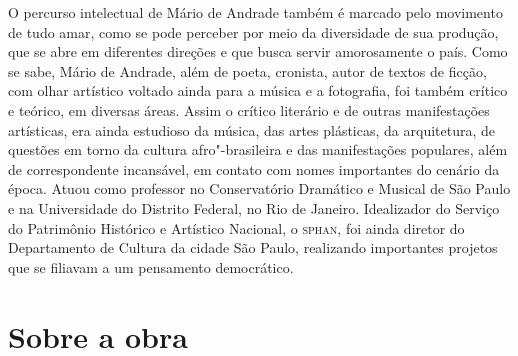 \medskip

O percurso intelectual de Mário de Andrade também é marcado pelo
movimento de tudo amar, como se pode perceber por meio da diversidade de
sua produção, que se abre em diferentes direções e que busca servir
amorosamente o país. Como se sabe, Mário de Andrade, além de poeta,
cronista, autor de textos de ficção, com olhar artístico voltado ainda
para a música e a fotografia, foi também crítico e teórico, em diversas
áreas. Assim o crítico literário e de outras manifestações artísticas,
era ainda estudioso da música, das artes plásticas, da arquitetura, de
questões em torno da cultura afro"-brasileira e das manifestações
populares, além de correspondente incansável, em contato com nomes
importantes do cenário da época. Atuou como professor no Conservatório
Dramático e Musical de São Paulo e na Universidade do Distrito Federal,
no Rio de Janeiro. Idealizador do Serviço do Patrimônio Histórico e
Artístico Nacional, o \textsc{sphan}, foi ainda diretor do Departamento de
Cultura da cidade São Paulo, realizando importantes projetos que se
filiavam a um pensamento democrático.

\section{Sobre a obra}

